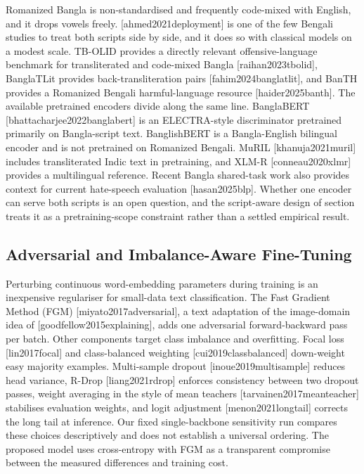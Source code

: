 \documentclass[11pt,a4paper]{article}
\def\citet#1{[#1]}%
\def\citep#1{[#1]}%
\def\cref#1{section}%
\begin{document}
Romanized Bangla is non-standardised and frequently code-mixed with English, and it drops vowels freely. \citet{ahmed2021deployment} is one of the few Bengali studies to treat both scripts side by side, and it does so with classical models on a modest scale. TB-OLID provides a directly relevant offensive-language benchmark for transliterated and code-mixed Bangla \citep{raihan2023tbolid}, BanglaTLit provides back-transliteration pairs \citep{fahim2024banglatlit}, and BanTH provides a Romanized Bengali harmful-language resource \citep{haider2025banth}. The available pretrained encoders divide along the same line. BanglaBERT \citep{bhattacharjee2022banglabert} is an ELECTRA-style discriminator pretrained primarily on Bangla-script text. BanglishBERT is a Bangla-English bilingual encoder and is not pretrained on Romanized Bengali. MuRIL \citep{khanuja2021muril} includes transliterated Indic text in pretraining, and XLM-R \citep{conneau2020xlmr} provides a multilingual reference. Recent Bangla shared-task work also provides context for current hate-speech evaluation \citep{hasan2025blp}. Whether one encoder can serve both scripts is an open question, and the script-aware design of \cref{sec:methodology} treats it as a pretraining-scope constraint rather than a settled empirical result.

\subsection{Adversarial and Imbalance-Aware Fine-Tuning}
\label{sec:rw-methods}

Perturbing continuous word-embedding parameters during training is an inexpensive regulariser for small-data text classification. The Fast Gradient Method (FGM) \citep{miyato2017adversarial}, a text adaptation of the image-domain idea of \citet{goodfellow2015explaining}, adds one adversarial forward-backward pass per batch. Other components target class imbalance and overfitting. Focal loss \citep{lin2017focal} and class-balanced weighting \citep{cui2019classbalanced} down-weight easy majority examples. Multi-sample dropout \citep{inoue2019multisample} reduces head variance, R-Drop \citep{liang2021rdrop} enforces consistency between two dropout passes, weight averaging in the style of mean teachers \citep{tarvainen2017meanteacher} stabilises evaluation weights, and logit adjustment \citep{menon2021longtail} corrects the long tail at inference. Our fixed single-backbone sensitivity run compares these choices descriptively and does not establish a universal ordering. The proposed model uses cross-entropy with FGM as a transparent compromise between the measured differences and training cost.
\end{document}
